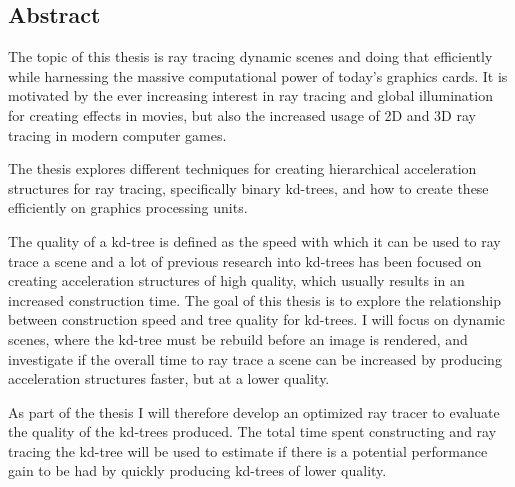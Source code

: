 
\begin{center}
\begin{minipage}{0.7\textwidth}
\vspace{6cm}

\section*{Abstract}

The topic of this thesis is ray tracing dynamic scenes and doing that
efficiently while harnessing the massive computational power of today's graphics
cards. It is motivated by the ever increasing interest in ray tracing and global
illumination for creating effects in movies, but also the increased usage of 2D
and 3D ray tracing in modern computer games.

The thesis explores different techniques for creating hierarchical acceleration
structures for ray tracing, specifically binary kd-trees, and how to create
these efficiently on graphics processing units.

The quality of a kd-tree is defined as the speed with which it can be used to
ray trace a scene and a lot of previous research into kd-trees has been focused
on creating acceleration structures of high quality, which usually results in an
increased construction time. The goal of this thesis is to explore the
relationship between construction speed and tree quality for kd-trees. I will
focus on dynamic scenes, where the kd-tree must be rebuild before an image is
rendered, and investigate if the overall time to ray trace a scene can be
increased by producing acceleration structures faster, but at a lower quality.

As part of the thesis I will therefore develop an optimized ray tracer to
evaluate the quality of the kd-trees produced. The total time spent constructing
and ray tracing the kd-tree will be used to estimate if there is a potential
performance gain to be had by quickly producing kd-trees of lower quality.

\end{minipage}
\end{center}


